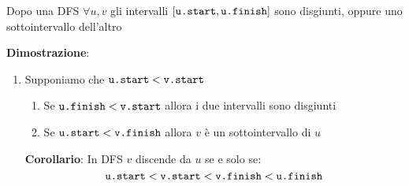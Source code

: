 \documentclass[a4paper]{article}
\begin{document}
\begin{theorem}
  Dopo una DFS \( \forall u, v \) gli intervalli \( [\text{\texttt{u.start}},
  \text{\texttt{u.finish}}] \) sono disgiunti, oppure uno sottointervallo dell'altro

  \vspace{1em}
  \noindent
  \textbf{Dimostrazione}:
  \begin{enumerate}
    \item Supponiamo che \( \text{\texttt{u.start}} < \text{\texttt{v.start}} \)
      \begin{enumerate}
        \item Se \( \text{\texttt{u.finish}} < \text{\texttt{v.start}} \) allora
          i due intervalli sono disgiunti
        \item Se \( \text{\texttt{u.start}} < \text{\texttt{v.finish}} \) allora
          \( v \) è un sottointervallo di \( u \) 
      \end{enumerate}
      \textbf{Corollario}: In DFS \( v \) discende da \( u \) se e solo se:
      \[
        \text{\texttt{u.start}} < \text{\texttt{v.start}} < \text{\texttt{v.finish}} < \text{\texttt{u.finish}}
      \] 
  \end{enumerate}
\end{theorem}
\end{document}
